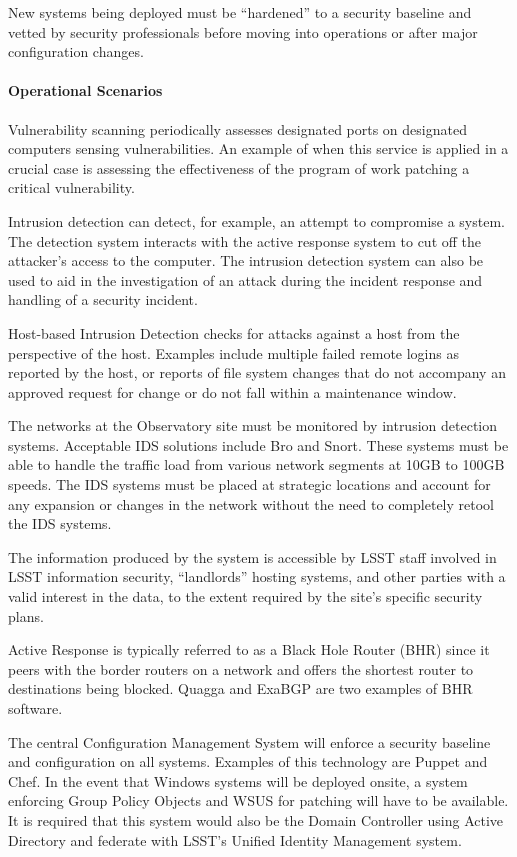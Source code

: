 New systems being deployed must be ``hardened'' to a security baseline and 
vetted by security professionals before moving into operations or after major 
configuration changes.

\paragraph{Operational Scenarios}

Vulnerability scanning periodically assesses designated ports on designated 
computers sensing vulnerabilities. An example of when this service is applied in 
a crucial case is assessing the effectiveness of the program of work patching a 
critical vulnerability.

Intrusion detection can detect, for example, an attempt to compromise a system. 
The detection system interacts with the active response system to cut off the 
attacker’s access to the computer. The intrusion detection system can also be 
used to aid in the investigation of an attack during the incident response and 
handling of a security incident.

Host-based Intrusion Detection checks for attacks against a host from the 
perspective of the host. Examples include multiple failed remote logins as reported 
by the host, or reports of file system changes that do not accompany an approved 
request for change or do not fall within a maintenance window.

The networks at the Observatory site must be monitored by intrusion detection 
systems. Acceptable IDS solutions include Bro and Snort. These systems must be 
able to handle the traffic load from various network segments at 10GB to 100GB 
speeds. The IDS systems must be placed at strategic locations and account for 
any expansion or changes in the network without the need to completely retool 
the IDS systems.

The information produced by the system is accessible by LSST staff involved in 
LSST information security, “landlords” hosting systems, and other parties with a 
valid interest in the data, to the extent required by the site’s specific security plans.

Active Response is typically referred to as a Black Hole Router (BHR) since it peers 
with the border routers on a network and offers the shortest router to 
destinations being blocked.  Quagga and ExaBGP are two examples of BHR software.

The central Configuration Management System will enforce a security baseline and 
configuration on all systems. Examples of this technology are Puppet and Chef. 
In the event that Windows systems will be deployed onsite, a system enforcing 
Group Policy Objects and WSUS for patching will have to be available. It is 
required that this system would also be the Domain Controller using Active 
Directory and federate with LSST’s Unified Identity Management system.

